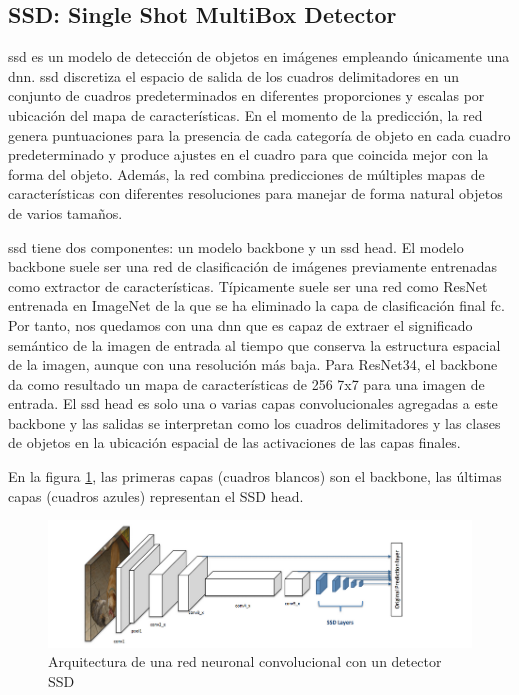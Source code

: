 \subsection{SSD: Single Shot MultiBox Detector}
\label{subsec:ssd}

\gls{ssd} \cite{Liu_2016} es un modelo de detección de objetos en imágenes empleando únicamente una \gls{dnn}. \gls{ssd} discretiza el espacio de salida de los cuadros delimitadores en un conjunto de cuadros predeterminados en diferentes proporciones y escalas por ubicación del mapa de características. En el momento de la predicción, la red genera puntuaciones para la presencia de cada categoría de objeto en cada cuadro predeterminado y produce ajustes en el cuadro para que coincida mejor con la forma del objeto. Además, la red combina predicciones de múltiples mapas de características con diferentes resoluciones para manejar de forma natural objetos de varios tamaños.

\gls{ssd} tiene dos componentes: un modelo backbone y un \gls{ssd} head. El modelo backbone suele ser una red de clasificación de imágenes previamente entrenadas como extractor de características. Típicamente suele ser una red como ResNet entrenada en ImageNet \cite{russakovsky2015imagenet} de la que se ha eliminado la capa de clasificación final \gls{fc}. Por tanto, nos quedamos con una \gls{dnn} que es capaz de extraer el significado semántico de la imagen de entrada al tiempo que conserva la estructura espacial de la imagen, aunque con una resolución más baja. Para ResNet34, el backbone da como resultado un mapa de características de 256 7x7 para una imagen de entrada. El \gls{ssd} head es solo una o varias capas convolucionales agregadas a este backbone y las salidas se interpretan como los cuadros delimitadores y las clases de objetos en la ubicación espacial de las activaciones de las capas finales.

En la figura \ref{fig:ssd-structure}, las primeras capas (cuadros blancos) son el backbone, las últimas capas (cuadros azules) representan el SSD head.

\begin{figure}[ht]
\centering
\includegraphics[width=1\textwidth]{img/chapters/estado-del-arte/ssd-structure.png}
\caption{\label{fig:ssd-structure}Arquitectura de una red neuronal convolucional con un detector SSD \cite{how-works-ssd}}
\end{figure}

